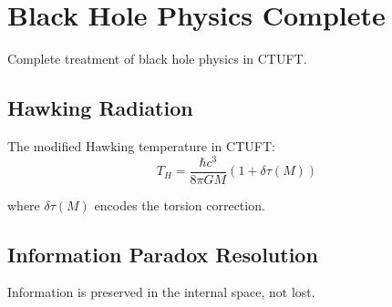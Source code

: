 \section{Black Hole Physics Complete}
\label{sec:bh_complete}

Complete treatment of black hole physics in CTUFT.

\subsection{Hawking Radiation}

The modified Hawking temperature in CTUFT:
\begin{equation}
T_H = \frac{\hbar c^3}{8\pi G M} \left(1 + \delta\tau(M)\right)
\end{equation}

where $\delta\tau(M)$ encodes the torsion correction.

\subsection{Information Paradox Resolution}

Information is preserved in the internal space, not lost.
